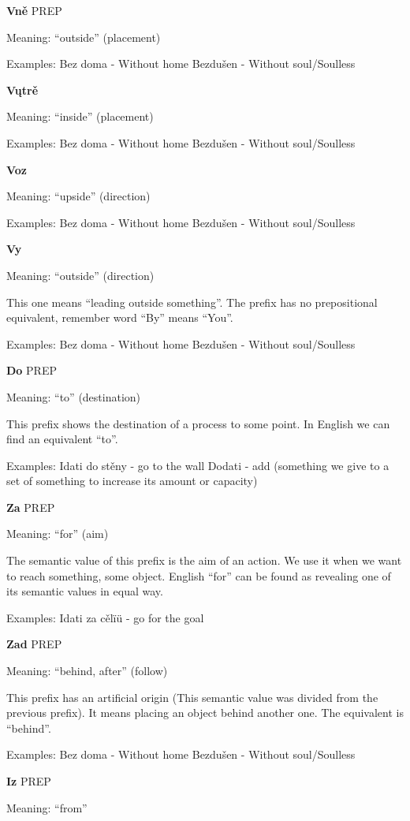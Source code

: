 \textbf{Vně} PREP

Meaning: “outside” (placement)

Examples:
Bez doma - Without home
Bezdušen - Without soul/Soulless 

\textbf{Vųtrě}

Meaning: “inside” (placement)

Examples:
Bez doma - Without home
Bezdušen - Without soul/Soulless 


\textbf{Voz}

Meaning: “upside” (direction)

Examples:
Bez doma - Without home
Bezdušen - Without soul/Soulless 

\textbf{Vy}

Meaning: “outside” (direction)

This one means “leading outside something”. The prefix has no prepositional equivalent, remember word “By” means “You”.

Examples:
Bez doma - Without home
Bezdušen - Without soul/Soulless 


\textbf{Do} PREP

Meaning: “to” (destination)

This prefix shows the destination of a process to some point. In English we can find an equivalent “to”.

Examples:
Idati do stěny - go to the wall
Dodati - add (something we give to a set of something to increase its amount or capacity)

\textbf{Za} PREP

Meaning: “for” (aim)

The semantic value of this prefix is the aim of an action. We use it when we want to reach something, some object. English “for” can be found as revealing one of its semantic values in equal way. 

Examples:
Idati za cělïü - go for the goal



\textbf{Zad} PREP

Meaning: “behind, after” (follow)

This prefix has an artificial origin (This semantic value was divided from the previous prefix). It means placing an object behind another one. The equivalent is “behind”.

Examples:
Bez doma - Without home
Bezdušen - Without soul/Soulless 

\textbf{Iz} PREP

Meaning: “from”

